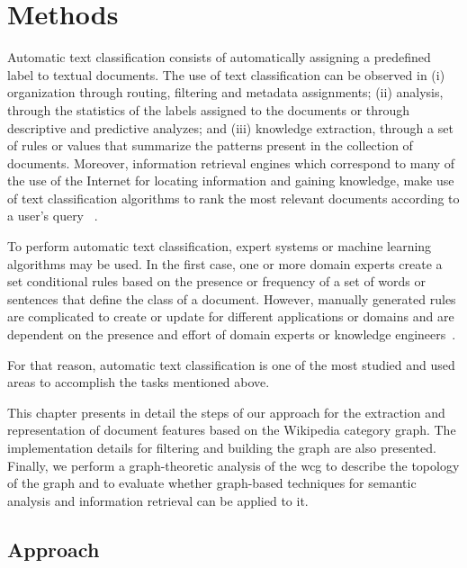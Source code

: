 \chapter{\hspace*{3pt} Methods}
\label{chapter:methodology}

Automatic text classification consists of automatically assigning a predefined label to textual documents. The use of text classification can be observed in (i) organization through routing, filtering and metadata assignments; (ii) analysis, through the statistics of the labels assigned to the documents or through descriptive and predictive analyzes; and (iii) knowledge extraction, through a set of rules or values that summarize the patterns present in the collection of documents. 
Moreover, information retrieval engines which correspond to many of the use of the Internet for locating information and gaining knowledge, make use of text classification algorithms to rank the most relevant documents according to a user's query ~\cite{Manning:2008}.

To perform automatic text classification, expert systems or machine learning algorithms may be used. In the first case, one or more domain experts create a set conditional rules based on the presence or frequency of a set of words or sentences that define the class of a document. However, manually generated rules are complicated to create or update for different applications or domains and are dependent on the presence and effort of domain experts or knowledge engineers~\cite{Manning:2008}. 

For that reason, automatic text classification is one of the most studied and used areas to accomplish the tasks mentioned above. 

This chapter presents in detail the steps of our approach for the extraction and representation of document features based on the Wikipedia category graph. The implementation details for filtering and building the graph are also presented. Finally, we perform a graph-theoretic analysis of the \gls{wcg} to describe the topology of the graph and to evaluate whether graph-based techniques for semantic analysis and information retrieval can be applied to it.


\section{\hspace*{3pt} Approach} \label{sec:approach}

